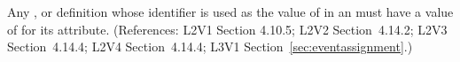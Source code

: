 Any \Compartment, \Species or \Parameter definition whose identifier is
used as the value of  in an \EventAssignment must have a
value of  for its  attribute.  (References: 
L2V1 Section 4.10.5; L2V2 Section~4.14.2; L2V3 Section~4.14.4; L2V4 
Section~4.14.4; L3V1 Section~\ref{sec:eventassignment}.)
